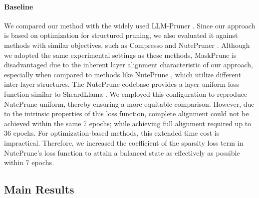 \paragraph{Baseline}

We compared our method with the widely used LLM-Pruner \cite{ma2023llm}. Since our approach is based on optimization for structured pruning, we also evaluated it against methods with similar objectives, such as Compresso \cite{guo2023compresso} and NutePruner \cite{li2024nuteprune}. Although we adopted the same experimental settings as these methods, MaskPrune is disadvantaged due to the inherent layer alignment characteristic of our approach, especially when compared to methods like NutePrune \cite{li2024nuteprune}, which utilize different inter-layer structures. The NutePrune codebase provides a layer-uniform loss function similar to SheardLlama \cite{xia2023sheared}. We employed this configuration to reproduce NutePrune-uniform, thereby ensuring a more equitable comparison. However, due to the intrinsic properties of this loss function, complete alignment could not be achieved within the same 7 epochs; while achieving full alignment required up to 36 epochs. For optimization-based methods, this extended time cost is impractical. Therefore, we increased the coefficient of the sparsity loss term in NutePrune's loss function to attain a balanced state as effectively as possible within 7 epochs.

\subsection{Main Results}


